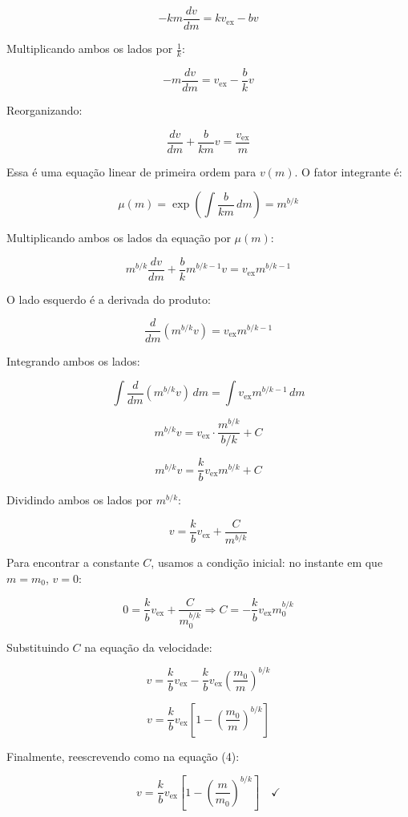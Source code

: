 \documentclass[a4paper,12pt]{article}
\newcommand{\printingbibliography}{%

    \pagestyle{myheadings}
    \markright{}
    \sloppy
    \printbibliography[heading=bibintoc, %
                   title=Refer\^encias %
                  ]
    \fussy%
}
\begin{document}
\begin{flushleft}
\[
-k m \frac{dv}{dm} = k v_{\text{ex}} - b v
\]

Multiplicando ambos os lados por \( \frac{1}{k} \):

\[
- m \frac{dv}{dm} = v_{\text{ex}} - \frac{b}{k} v
\]

Reorganizando:

\[
\frac{dv}{dm} + \frac{b}{k m} v = \frac{v_{\text{ex}}}{m}
\]

Essa é uma equação linear de primeira ordem para \( v(m) \). O fator integrante é:

\[
\mu(m) = \exp\left( \int \frac{b}{k m} \, dm \right) = m^{b/k}
\]

Multiplicando ambos os lados da equação por \( \mu(m) \):

\[
m^{b/k} \frac{dv}{dm} + \frac{b}{k} m^{b/k - 1} v = v_{\text{ex}} m^{b/k - 1}
\]

O lado esquerdo é a derivada do produto:

\[
\frac{d}{dm} \left( m^{b/k} v \right) = v_{\text{ex}} m^{b/k - 1}
\]

Integrando ambos os lados:

\[
\int \frac{d}{dm} \left( m^{b/k} v \right) \, dm = \int v_{\text{ex}} m^{b/k - 1} \, dm
\]

\[
m^{b/k} v = v_{\text{ex}} \cdot \frac{m^{b/k}}{b/k} + C
\]

\[
m^{b/k} v = \frac{k}{b} v_{\text{ex}} m^{b/k} + C
\]

Dividindo ambos os lados por \( m^{b/k} \):

\[
v = \frac{k}{b} v_{\text{ex}} + \frac{C}{m^{b/k}}
\]

Para encontrar a constante \( C \), \colorbox{yellow!20}{usamos a condição inicial: no instante em que \( m = m_0 \),} 
\colorbox{yellow!20}{\( v = 0 \):}

\[
0 = \frac{k}{b} v_{\text{ex}} + \frac{C}{m_0^{b/k}} \Rightarrow \boxed{C = - \frac{k}{b} v_{\text{ex}} m_0^{b/k}}
\]

Substituindo \( C \) na equação da velocidade:

\[
v = \frac{k}{b} v_{\text{ex}} - \frac{k}{b} v_{\text{ex}} \left( \frac{m_0}{m} \right)^{b/k}
\]

\[
v = \frac{k}{b} v_{\text{ex}} \left[ 1 - \left( \frac{m_0}{m} \right)^{b/k} \right]
\]

Finalmente, reescrevendo como na equação (4):

\[
\boxed{v = \frac{k}{b} v_{\text{ex}} \left[ 1 - \left( \frac{m}{m_0} \right)^{b/k} \right]} \quad \checkmark
\]

\end{flushleft}

\end{document}
